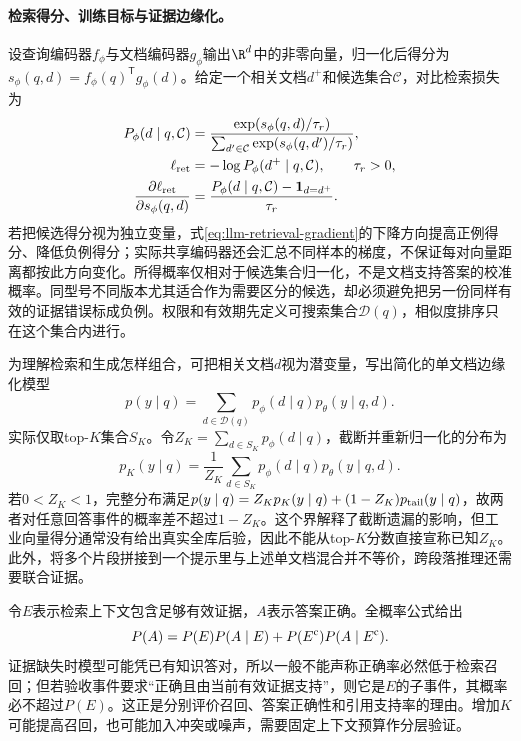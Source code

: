 \paragraph{检索得分、训练目标与证据边缘化。}
设查询编码器$f_\phi$与文档编码器$g_\phi$输出$\R^d$中的非零向量，归一化后得分为$s_\phi(q,d)=f_\phi(q)^{\mathsf T}g_\phi(d)$。给定一个相关文档$d^+$和候选集合$\mathcal C$，对比检索损失为
\begin{align}
 P_\phi(d\mid q,\mathcal C)&=\frac{\exp(s_\phi(q,d)/\tau_r)}{\sum_{d'\in\mathcal C}\exp(s_\phi(q,d')/\tau_r)},\\
 \ell_{\rm ret}&=-\log P_\phi(d^+\mid q,\mathcal C),\qquad \tau_r>0,\\
 \frac{\partial\ell_{\rm ret}}{\partial s_\phi(q,d)}&=\frac{P_\phi(d\mid q,\mathcal C)-\mathbf1_{d=d^+}}{\tau_r}.\label{eq:llm-retrieval-gradient}
\end{align}
若把候选得分视为独立变量，式\eqref{eq:llm-retrieval-gradient}的下降方向提高正例得分、降低负例得分；实际共享编码器还会汇总不同样本的梯度，不保证每对向量距离都按此方向变化。所得概率仅相对于候选集合归一化，不是文档支持答案的校准概率。同型号不同版本尤其适合作为需要区分的候选，却必须避免把另一份同样有效的证据错误标成负例。权限和有效期先定义可搜索集合$\mathcal D(q)$，相似度排序只在这个集合内进行。

为理解检索和生成怎样组合，可把相关文档$d$视为潜变量，写出简化的单文档边缘化模型
\begin{equation}
 p(y\mid q)=\sum_{d\in\mathcal D(q)}p_\phi(d\mid q)p_\theta(y\mid q,d).
\end{equation}
实际仅取top-$K$集合$S_K$。令$Z_K=\sum_{d\in S_K}p_\phi(d\mid q)$，截断并重新归一化的分布为
\begin{equation}
 p_K(y\mid q)=\frac1{Z_K}\sum_{d\in S_K}p_\phi(d\mid q)p_\theta(y\mid q,d).
\end{equation}
若$0<Z_K<1$，完整分布满足$p(y\mid q)=Z_Kp_K(y\mid q)+(1-Z_K)p_{\rm tail}(y\mid q)$，故两者对任意回答事件的概率差不超过$1-Z_K$。这个界解释了截断遗漏的影响，但工业向量得分通常没有给出真实全库后验，因此不能从top-$K$分数直接宣称已知$Z_K$。此外，将多个片段拼接到一个提示里与上述单文档混合并不等价，跨段落推理还需要联合证据。

令$E$表示检索上下文包含足够有效证据，$A$表示答案正确。全概率公式给出
\begin{equation}
 P(A)=P(E)P(A\mid E)+P(E^{\rm c})P(A\mid E^{\rm c}).
\end{equation}
证据缺失时模型可能凭已有知识答对，所以一般不能声称正确率必然低于检索召回；但若验收事件要求“正确且由当前有效证据支持”，则它是$E$的子事件，其概率必不超过$P(E)$。这正是分别评价召回、答案正确性和引用支持率的理由。增加$K$可能提高召回，也可能加入冲突或噪声，需要固定上下文预算作分层验证。

